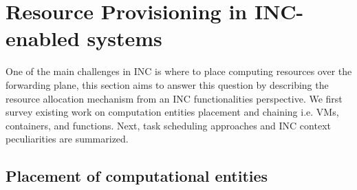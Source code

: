 \section{Resource Provisioning in INC-enabled systems}\label{ResourceAllocation}
One of the main challenges in INC is where to place computing resources over the forwarding plane, this section aims to answer this question by describing the resource allocation mechanism from an INC functionalities perspective. We first survey existing work on computation entities placement and chaining i.e. VMs, containers, and functions. Next, task scheduling approaches and INC context peculiarities are summarized.


 
\subsection{Placement of computational entities}

